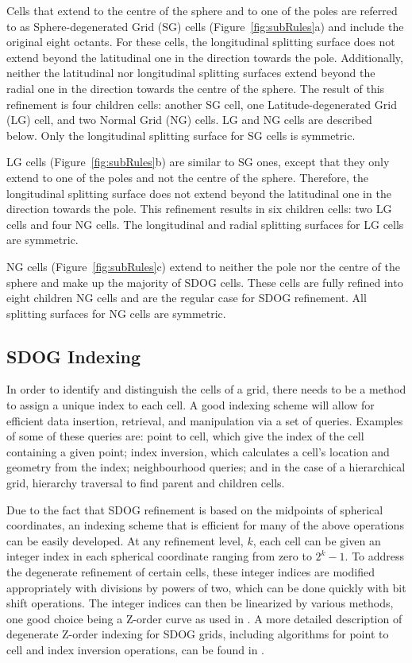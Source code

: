 Cells that extend to the centre of the sphere and to one of the poles are referred to as Sphere-degenerated Grid (SG) cells (Figure~\ref{fig:subRules}a) and include the original eight octants.
For these cells, the longitudinal splitting surface does not extend beyond the latitudinal one in the direction towards the pole.
Additionally, neither the latitudinal nor longitudinal splitting surfaces extend beyond the radial one in the direction towards the centre of the sphere.
The result of this refinement is four children cells: another SG cell, one Latitude-degenerated Grid (LG) cell, and two Normal Grid (NG) cells.
LG and NG cells are described below.
Only the longitudinal splitting surface for SG cells is symmetric.


LG cells (Figure~\ref{fig:subRules}b) are similar to SG ones, except that they only extend to one of the poles and not the centre of the sphere.
Therefore, the longitudinal splitting surface does not extend beyond the latitudinal one in the direction towards the pole.
This refinement results in six children cells: two LG cells and four NG cells.
The longitudinal and radial splitting surfaces for LG cells are symmetric.


NG cells (Figure~\ref{fig:subRules}c) extend to neither the pole nor the centre of the sphere and make up the majority of SDOG cells.
These cells are fully refined into eight children NG cells and are the regular case for SDOG refinement.
All splitting surfaces for NG cells are symmetric.


\subsection{SDOG Indexing} \label{sec:sdog-indexing}
In order to identify and distinguish the cells of a grid, there needs to be a method to assign a unique index to each cell.
A good indexing scheme will allow for efficient data insertion, retrieval, and manipulation via a set of queries.
Examples of some of these queries are: point to cell, which give the index of the cell containing a given point; index inversion, which calculates a cell's location and geometry from the index; neighbourhood queries; and in the case of a hierarchical grid, hierarchy traversal to find parent and children cells.


Due to the fact that SDOG refinement is based on the midpoints of spherical coordinates, an indexing scheme that is efficient for many of the above operations can be easily developed.
At any refinement level, $k$, each cell can be given an integer index in each spherical coordinate ranging from zero to $2^{k} - 1$.
To address the degenerate refinement of certain cells, these integer indices are modified appropriately with divisions by powers of two, which can be done quickly with bit shift operations.
The integer indices can then be linearized by various methods, one good choice being a Z-order curve \cite{morton1966computer} as used in \cite{yu2009sdog}.
A more detailed description of degenerate Z-order indexing for SDOG grids, including algorithms for point to cell and index inversion operations, can be found in \cite{yu2009coding}.


